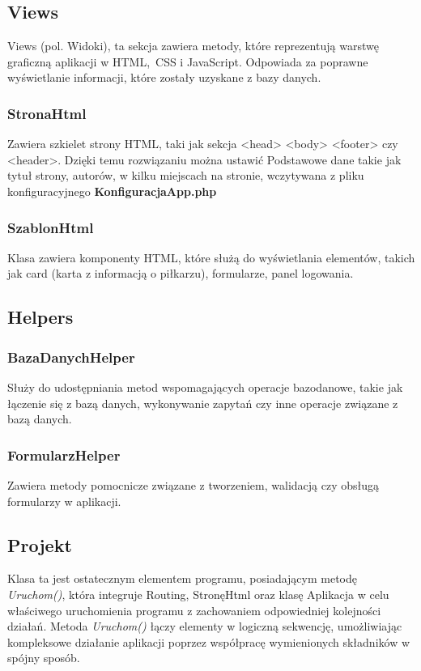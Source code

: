 \subsection{Views}
    Views (pol. Widoki), ta sekcja zawiera metody, które reprezentują warstwę graficzną aplikacji w HTML, CSS i JavaScript. Odpowiada za poprawne wyświetlanie informacji, które zostały uzyskane z bazy danych.
    \subsubsection{StronaHtml}
    Zawiera szkielet strony HTML, taki jak sekcja <head> <body> <footer> czy <header>. Dzięki temu rozwiązaniu można ustawić Podstawowe dane takie jak tytuł strony, autorów, w kilku miejscach na stronie, wczytywana z pliku konfiguracyjnego \textbf{KonfiguracjaApp.php}
     

    \subsubsection{SzablonHtml}
    Klasa zawiera komponenty HTML, które służą do wyświetlania elementów, takich jak card (karta z informacją o piłkarzu), formularze, panel logowania.
     


\subsection{Helpers}

    \subsubsection{BazaDanychHelper}
    Służy do udostępniania metod wspomagających operacje bazodanowe, takie jak łączenie się z bazą danych, wykonywanie zapytań czy inne operacje związane z bazą danych. 
     


    \subsubsection{FormularzHelper}
    Zawiera metody pomocnicze związane z tworzeniem, walidacją czy obsługą formularzy w aplikacji.
     

    
\subsection{Projekt}
    Klasa ta jest ostatecznym elementem programu, posiadającym metodę \textit{Uruchom()}, która integruje Routing, StronęHtml oraz klasę Aplikacja w celu właściwego uruchomienia programu z zachowaniem odpowiedniej kolejności działań. Metoda \textit{Uruchom()} łączy elementy w logiczną sekwencję, umożliwiając kompleksowe działanie aplikacji poprzez współpracę wymienionych składników w spójny sposób.
     


